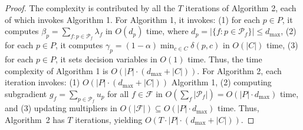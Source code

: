 \begin{proof}
The complexity is contributed by all the $T$ iterations of Algorithm 2, each of which invokes Algorithm 1. For Algorithm 1, it invokes: (1) for each $p \in P$, it computes $\beta_p = \sum_{f: p \in \mathcal{P}_f} \lambda_f$ in $O(d_p)$ time, where $d_p = |\{f : p \in \mathcal{P}_f\}| \leq d_{\max}$, (2) for each $p \in P$, it computes $\gamma_p = (1-\alpha) \min_{c \in C} \delta(p,c)$ in $O(|C|)$ time, (3) for each $p \in P$, it sets decision variables in $O(1)$ time. Thus, the time complexity of Algorithm 1 is $O(|P| \cdot (d_{\max} + |C|))$. For Algorithm 2, each iteration invokes: (1) $O(|P| \cdot (d_{\max} + |C|))$ Algorithm 1, (2) computing subgradient $g_f = \sum_{p \in \mathcal{P}_f} u_p$ for all $f \in \mathcal{F}$ in $O\left(\sum_f |\mathcal{P}_f|\right) = O(|P| \cdot d_{\max})$ time, and (3) updating multipliers in $O(|\mathcal{F}|) \subseteq O(|P| \cdot d_{\max})$ time. Thus, Algorithm~2 has $T$ iterations, yielding $O(T \cdot |P| \cdot (d_{\max} + |C|))$.
\end{proof}





